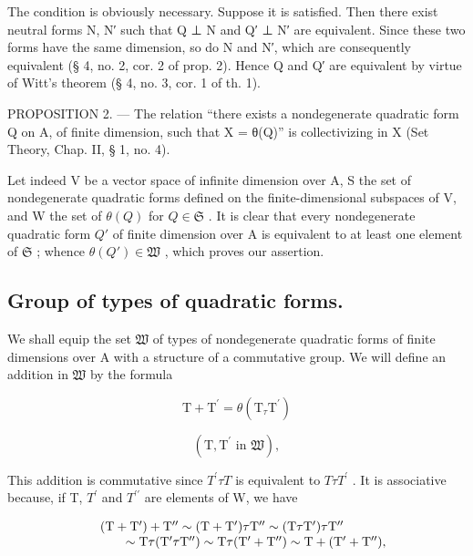 The condition is obviously necessary. Suppose it is satisfied. Then there exist neutral forms N, N′ such that Q ⊥ N and Q′ ⊥ N′ are equivalent. Since these two forms have the same dimension, so do N and N′, which are consequently equivalent (§ 4, no. 2, cor. 2 of prop. 2). Hence Q and Q′ are equivalent by virtue of Witt's theorem (§ 4, no. 3, cor. 1 of th. 1).

PROPOSITION 2. --- The relation “there exists a nondegenerate quadratic form Q on A, of finite dimension, such that X = θ(Q)” is collectivizing in X (Set Theory, Chap. II, § 1, no. 4).

Let indeed V be a vector space of infinite dimension over A, S the set of nondegenerate quadratic forms defined on the finite-dimensional subspaces of V, and W the set of \(\theta(Q)\) for \(Q \in \mathfrak{S}\) . It is clear that every nondegenerate quadratic form \(Q'\) of finite dimension over A is equivalent to at least one element of \(\mathfrak{S}\) ; whence \(\theta(Q') \in \mathfrak{W}\) , which proves our assertion.

\subsection{Group of types of quadratic forms.}

We shall equip the set \(\mathfrak{W}\) of types of nondegenerate quadratic forms of finite dimensions over A with a structure of a commutative group. We will define an addition in \(\mathfrak{W}\) by the formula

\[
\mathrm{T} + \mathrm{T} ^ {\prime} = \theta (\mathrm{T} _ {\tau} \mathrm{T} ^ {\prime})\tag{2}
\]

\[
(\mathrm{T}, \mathrm{T} ^ {\prime} \text {   in   } \mathfrak {W}),
\]

This addition is commutative since \(T^{\prime} \tau T\) is equivalent to \(T \tau T^{\prime}\) . It is associative because, if T, \(T^{\prime}\) and \(T^{\prime\prime}\) are elements of W, we have

\[
\begin{array}{r l} & (\mathrm{T} + \mathrm{T} ^ {\prime}) + \mathrm{T} ^ {\prime \prime} \sim (\mathrm{T} + \mathrm{T} ^ {\prime}) \tau \mathrm{T} ^ {\prime \prime} \sim (\mathrm{T} \tau \mathrm{T} ^ {\prime}) \tau \mathrm{T} ^ {\prime \prime} \\ & \qquad \sim \mathrm{T} \tau (\mathrm{T} ^ {\prime} \tau \mathrm{T} ^ {\prime \prime}) \sim \mathrm{T} \tau (\mathrm{T} ^ {\prime} + \mathrm{T} ^ {\prime \prime}) \sim \mathrm{T} + (\mathrm{T} ^ {\prime} + \mathrm{T} ^ {\prime \prime}), \end{array}
\]


